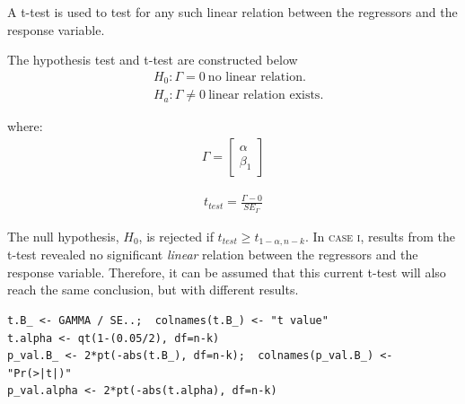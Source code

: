 \documentclass[10pt, twoside, openleft]{article}
\begin{document}
\noindent
A t-test is used to test for any such linear relation between the regressors and the
response variable.
\smallskip

\noindent
The hypothesis test and t-test are constructed below
\begin{equation*}
\begin{aligned}
& H_{0}: \Gamma = 0 \ \text{no linear relation.} \\
& H_{a}: \Gamma \neq 0 \ \text{linear relation exists.}
\end{aligned}
\end{equation*}
\smallskip

where:
\begin{equation*}
\begin{aligned}
\Gamma = 
\left[ \begin{array}{c}
    \alpha \\
    \beta_{1}
\end{array}\right]
\end{aligned}
\end{equation*}
\smallskip

\begin{equation*}
\begin{aligned}
t_{test} = \frac{ \Gamma - 0 }{ SE_{\Gamma} }
\end{aligned}
\end{equation*}
\smallskip

The null hypothesis, $H_{0}$, is rejected if $t_{test} \geq t_{1-\alpha, n-k}$. In \textsc{case i},
results from the t-test revealed no significant \emph{linear} relation between the regressors and
the response variable. Therefore, it can be assumed that this current t-test will also reach
the same conclusion, but with different results.
\smallskip

\begin{verbatim}
t.B_ <- GAMMA / SE..;  colnames(t.B_) <- "t value"
t.alpha <- qt(1-(0.05/2), df=n-k)
p_val.B_ <- 2*pt(-abs(t.B_), df=n-k);  colnames(p_val.B_) <- "Pr(>|t|)"
p_val.alpha <- 2*pt(-abs(t.alpha), df=n-k)
\end{verbatim}
\end{document}
